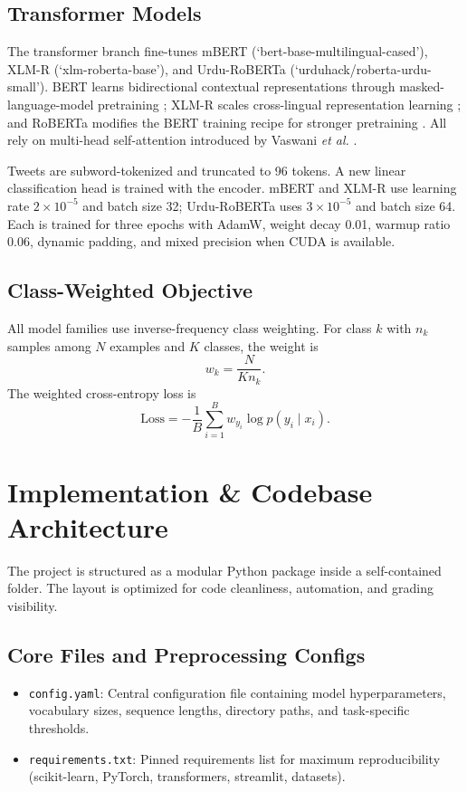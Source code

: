 \documentclass[conference]{IEEEtran}
\begin{document}
\subsection{Transformer Models}
The transformer branch fine-tunes mBERT (`bert-base-multilingual-cased'), XLM-R (`xlm-roberta-base'), and Urdu-RoBERTa (`urduhack/roberta-urdu-small'). BERT learns bidirectional contextual representations through masked-language-model pretraining \cite{devlin2019bert}; XLM-R scales cross-lingual representation learning \cite{conneau2020xlmr}; and RoBERTa modifies the BERT training recipe for stronger pretraining \cite{liu2019roberta}. All rely on multi-head self-attention introduced by Vaswani \emph{et al.} \cite{vaswani2017attention}.

Tweets are subword-tokenized and truncated to 96 tokens. A new linear classification head is trained with the encoder. mBERT and XLM-R use learning rate $2\times10^{-5}$ and batch size 32; Urdu-RoBERTa uses $3\times10^{-5}$ and batch size 64. Each is trained for three epochs with AdamW, weight decay 0.01, warmup ratio 0.06, dynamic padding, and mixed precision when CUDA is available.

\subsection{Class-Weighted Objective}
All model families use inverse-frequency class weighting. For class $k$ with $n_k$ samples among $N$ examples and $K$ classes, the weight is
\begin{equation}
w_k=\frac{N}{K n_k}.
\end{equation}
The weighted cross-entropy loss is
\begin{equation}
\text{Loss} = -\frac{1}{B}\sum_{i=1}^{B}w_{y_i}\log p(y_i\mid x_i).
\end{equation}

\section{Implementation \& Codebase Architecture}

The project is structured as a modular Python package inside a self-contained folder. The layout is optimized for code cleanliness, automation, and grading visibility.

\subsection{Core Files and Preprocessing Configs}
\begin{itemize}[leftmargin=*]
    \item \texttt{config.yaml}: Central configuration file containing model hyperparameters, vocabulary sizes, sequence lengths, directory paths, and task-specific thresholds.
    \item \texttt{requirements.txt}: Pinned requirements list for maximum reproducibility (scikit-learn, PyTorch, transformers, streamlit, datasets).
\end{itemize}
\end{document}
